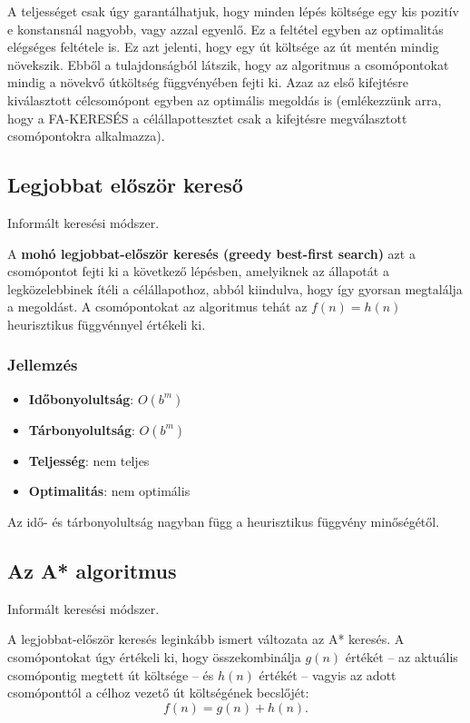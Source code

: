 A teljességet csak úgy garantálhatjuk, hogy minden lépés költsége
egy kis pozitív e konstansnál nagyobb, vagy azzal egyenlő. Ez a feltétel egyben
az optimalitás elégséges feltétele is. Ez azt jelenti, hogy egy út költsége az
út mentén mindig növekszik. Ebből a tulajdonságból látszik, hogy az algoritmus
a csomópontokat mindig a növekvő útköltség függvényében fejti ki. Azaz az első
kifejtésre kiválasztott célcsomópont egyben az optimális megoldás is
(emlékezzünk arra, hogy a FA-KERESÉS a célállapottesztet csak a kifejtésre
megválasztott csomópontokra alkalmazza).

\subsection{Legjobbat először kereső}

Informált keresési módszer.

A {\bf mohó legjobbat-először keresés (greedy best-first search)} azt a
csomópontot fejti ki a következő lépésben, amelyiknek az állapotát a
legközelebbinek ítéli a célállapothoz, abból kiindulva, hogy így gyorsan
megtalálja a megoldást. A csomópontokat az algoritmus tehát az $f(n) = h(n)$
heurisztikus függvénnyel értékeli ki.

\subsubsection{Jellemzés}

\begin{itemize}
    \item {\bf Időbonyolultság}: $O(b^m)$
    \item {\bf Tárbonyolultság}: $O(b^m)$
    \item {\bf Teljesség}: nem teljes
    \item {\bf Optimalitás}: nem optimális
\end{itemize}

\begin{megjegyzes}
    Az idő- és tárbonyolultság nagyban függ a heurisztikus függvény
    minőségétől.
\end{megjegyzes}

\subsection{Az A* algoritmus}

Informált keresési módszer.

A legjobbat-először keresés leginkább ismert változata az A* keresés. A
csomópontokat úgy értékeli ki, hogy összekombinálja $g(n)$ értékét – az aktuális
csomópontig megtett út költsége – és $h(n)$ értékét – vagyis az adott
csomóponttól a célhoz vezető út költségének becslőjét: \[
    f(n) = g(n) + h(n)
.\]

